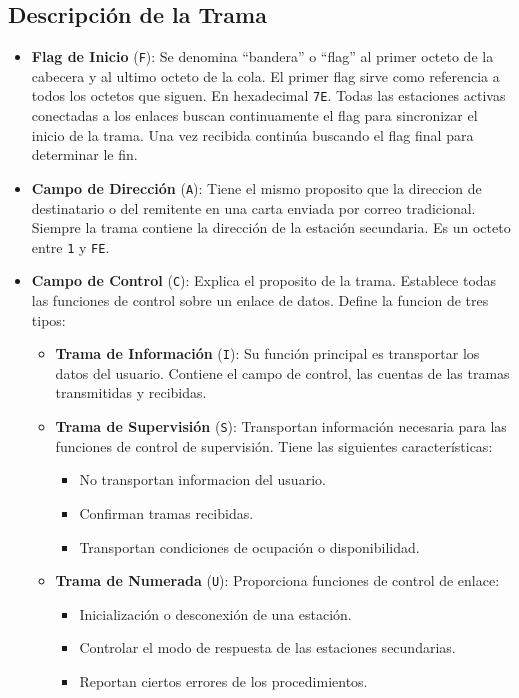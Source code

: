 \subsection*{Descripción de la Trama}
\begin{itemize}
\item \textbf{Flag de Inicio} (\texttt{F}): Se denomina ``bandera'' o ``flag'' al primer octeto de la cabecera y al ultimo octeto de la cola. El primer flag sirve como referencia a todos los octetos que siguen. En hexadecimal \texttt{7E}. Todas las estaciones activas conectadas a los enlaces buscan continuamente el flag para sincronizar el inicio de la trama. Una vez recibida continúa buscando el flag final para determinar le fin.
\item \textbf{Campo de Dirección} (\texttt{A}): Tiene el mismo proposito que la direccion de destinatario o del remitente en una carta enviada por correo tradicional. Siempre la trama contiene la dirección de la estación secundaria. Es un octeto entre \texttt{1} y \texttt{FE}.
\item \textbf{Campo de Control} (\texttt{C}): Explica el proposito de la trama. Establece todas las funciones de control sobre un enlace de datos.  Define la funcion de tres tipos:
\begin{itemize}
\item \textbf{Trama de Información} (\texttt{I}): Su función principal es transportar los datos del usuario. Contiene el campo de control, las cuentas de las tramas transmitidas y recibidas.
\item \textbf{Trama de Supervisión} (\texttt{S}): Transportan información necesaria para las funciones de control de supervisión. Tiene las siguientes características:
\begin{itemize}
\item No transportan informacion del usuario.
\item Confirman tramas recibidas.
\item Transportan condiciones de ocupación o disponibilidad.
\end{itemize}
\item \textbf{Trama de Numerada} (\texttt{U}): Proporciona funciones de control de enlace:
\begin{itemize}
\item Inicialización o desconexión de una estación.
\item Controlar el modo de respuesta de las estaciones secundarias.
\item Reportan ciertos errores de los procedimientos.

\end{itemize}
\end{itemize}
\end{itemize}
